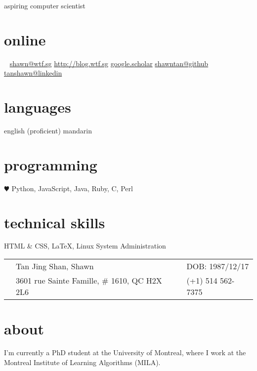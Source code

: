 \documentclass[]{friggeri-cv}
\begin{document}
{aspiring computer scientist

}

\begin{aside}
	\section{online}
	\Email~ \href{mailto:shawn@wtf.sg}{shawn@wtf.sg}
	\href{https://blog.wtf.sg}{http://blog.wtf.sg}
	\href{https://scholar.google.ca/citations?user=57Nf7EYAAAAJ&hl=en}{google.scholar}
	\href{http://github.com/shawntan}{shawntan@github}
	\href{http://sg.linkedin.com/in/tanshawn}{tanshawn@linkedin}
	\section{languages}
	english (proficient)
	mandarin
	\section{programming}
	{\color{red} $\varheartsuit$} Python, JavaScript, Java, Ruby, C, Perl
	\section{technical skills}
	HTML \& CSS, \LaTeX,
	Linux System Administration
\end{aside}
\begin{tabular}{ p{0.45cm} p{8cm} p{0.45cm} p{6.5cm} }
	\Male 	& Tan Jing Shan, Shawn	 & \Sagittarius &  DOB: 1987/12/17\\
	\Letter & 3601 rue Sainte Famille, \# 1610, QC H2X 2L6 & \Mobilefone & (+1) 
	514 562-7375\\
\end{tabular}


\section{about}
I'm currently a PhD student at the University of Montreal, where I work at the 
Montreal Institute of Learning Algorithms (MILA). \iftoggle{short}{}{I enjoy 
working on machine learning projects, and keeping up with the latest in neural 
networks research. I maintain a \href{http://blog.wtf.sg}{blog} where I write 
about my machine learning projects.}
\iftoggle{short}{}%
{

\section{research interests}
artificial intelligence, recurrent neural networks, machine learning,\\
reinforcement learning, graphical models, natural language processing, data 
mining
}
\end{document}
